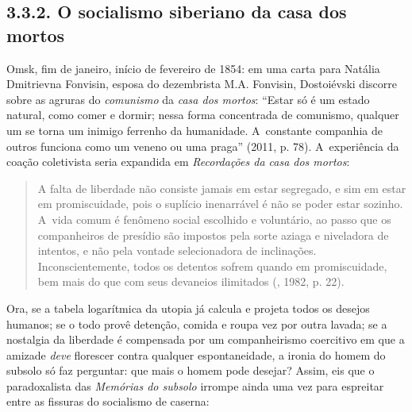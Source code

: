\subsection{3.3.2. O socialismo siberiano da casa dos mortos}

Omsk, fim de janeiro, início de fevereiro de 1854: em uma carta para
Natália Dmitrievna Fonvisin, esposa do dezembrista M.A. Fonvisin,
Dostoiévski discorre sobre as agruras do \emph{comunismo} da \emph{casa
dos mortos}: ``Estar só é um estado natural, como comer e dormir; nessa
forma concentrada de comunismo, qualquer um se torna um inimigo ferrenho
da humanidade. A~constante companhia de outros funciona como um veneno
ou uma praga'' (2011, p. 78). A~experiência da coação coletivista seria
expandida em \emph{Recordações da casa dos mortos}:

\begin{quote}
A falta de liberdade não consiste jamais em estar segregado, e sim em
estar em promiscuidade, pois o suplício inenarrável é não se poder estar
sozinho. A~vida comum é fenômeno social escolhido e voluntário, ao passo
que os companheiros de presídio são impostos pela sorte aziaga e
niveladora de intentos, e não pela vontade selecionadora de inclinações.
Inconscientemente, todos os detentos sofrem quando em promiscuidade, bem
mais do que com seus devaneios ilimitados (, 1982, p. 22).
\end{quote}

Ora, se a tabela logarítmica da utopia já calcula e projeta todos os
desejos humanos; se o todo provê detenção, comida e roupa vez por outra
lavada; se a nostalgia da liberdade é compensada por um companheirismo
coercitivo em que a amizade \emph{deve} florescer contra qualquer
espontaneidade, a ironia do homem do subsolo só faz perguntar: que mais
o homem pode desejar? Assim, eis que o paradoxalista das \emph{Memórias
do subsolo} irrompe ainda uma vez para espreitar entre as fissuras do
socialismo de caserna:

